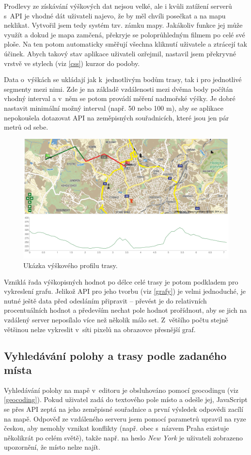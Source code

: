 Prodlevy ze získávání výškových dat nejsou velké, ale i kvůli zatížení
serverů s~API je vhodné dát uživateli najevo, že by měl chvíli
posečkat a na mapu neklikat. Vytvořil jsem tedy systém tzv. zámku
mapy. Jakákoliv funkce jej může využít a dokud je mapa zamčená,
překryje se poloprůhledným filmem po celé své ploše. Na ten potom
automaticky směřují všechna kliknutí uživatele a ztrácejí tak účinek.
Abych takový stav aplikace uživateli ozřejmil, nastavil jsem
překryvné vrstvě ve stylech (viz \ref{css}) kurzor do 
podoby.

Data o~výškách se ukládají jak k~jednotlivým bodům trasy, tak i pro
jednotlivé segmenty mezi nimi. Zde je na základě vzdálenosti mezi
dvěma body počítán vhodný interval a v~něm se potom provádí měření
nadmořské výšky. Je dobré nastavit minimální možný interval (např.
50 nebo 100 m), aby se aplikace nepokoušela dotazovat API na
zeměpisných souřadnicích, které jsou jen pár metrů od sebe.

\begin{figure}[h]
	\includegraphics[width=\textwidth, keepaspectratio]{fig/screenaltitude}
	\caption{Ukázka výškového profilu trasy.}
	\label{obrAltitude}
\end{figure}

Vzniklá řada výškopisných hodnot po délce celé trasy je potom
podkladem pro vykreslení grafu. Jelikož API pro jeho tvorbu
(viz \ref{grafy}) je velmi jednoduché, je nutné ještě data před
odesláním připravit -- převést je do relativních procentuálních
hodnot a především nechat pole hodnot prořídnout, aby se jich na
vzdálený server neposílalo více než několik málo set. Z~většího počtu
stejně většinou nelze vykreslit v~síti pixelů na obrazovce přesnější
graf.

\subsection{Vyhledávání polohy a trasy podle zadaného místa}
Vyhledávání polohy na mapě v~editoru je obsluhováno pomocí geocodingu
(viz \ref{geocoding}). Pokud uživatel zadá do textového pole místo a
odešle jej, JavaScript se přes API zeptá na jeho zeměpisné souřadnice
a první výsledek odpovědi zacílí na mapě. Odpověď ze vzdáleného
serveru jsem pomocí parametrů upravil na ryze českou, aby nemohly vznikat
konflikty (např. obec s~názvem Praha existuje několikrát po celém
světě), takže např. na heslo {\it New York} je uživateli zobrazeno
upozornění, že místo nelze najít.

